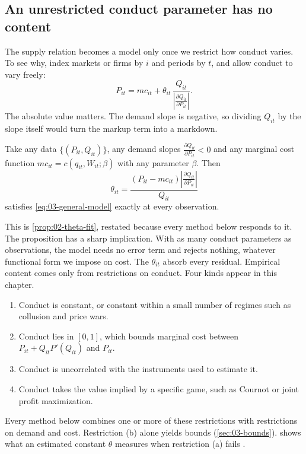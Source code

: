 \subsection{An unrestricted conduct parameter has no content}\label{sec:03-content}

The supply relation becomes a model only once we restrict how conduct varies. To see why, index markets or firms by
$i$ and periods by $t$, and allow conduct to vary freely:
\begin{equation}\label{eq:03-general-model}
P_{it} = mc_{it} + \theta_{it}\,\frac{Q_{it}}{\left\lvert \frac{\partial Q_{it}}{\partial P_{it}}\right\rvert}.
\end{equation}
The absolute value matters. The demand slope is negative, so dividing $Q_{it}$ by the slope itself would turn the
markup term into a markdown.

\begin{proposition}\label{prop:03-exact-fit}
Take any data $\{(P_{it}, Q_{it})\}$, any demand slopes $\frac{\partial Q_{it}}{\partial P_{it}} < 0$ and any marginal
cost function $mc_{it} = c(q_{it}, W_{it}; \beta)$ with any parameter $\beta$. Then
\begin{equation*}
\theta_{it} = \frac{(P_{it} - mc_{it})\left\lvert \frac{\partial Q_{it}}{\partial P_{it}}\right\rvert}{Q_{it}}
\end{equation*}
satisfies \eqref{eq:03-general-model} exactly at every observation.
\end{proposition}

This is \cref{prop:02-theta-fit}, restated because every method below responds to it. The proposition has a
sharp implication. With as many conduct parameters as observations, the model needs no error
term and rejects nothing, whatever functional form we impose on cost. The $\theta_{it}$ absorb every residual. Empirical
content comes only from restrictions on conduct. Four kinds appear in this chapter.
\begin{enumerate}[label=(\alph*)]
\item Conduct is constant, or constant within a small number of regimes such as collusion and price wars.
\item Conduct lies in $[0, 1]$, which bounds marginal cost between $P_{it} + Q_{it}P'(Q_{it})$ and $P_{it}$.
\item Conduct is uncorrelated with the instruments used to estimate it.
\item Conduct takes the value implied by a specific game, such as Cournot or joint profit maximization.
\end{enumerate}
Every method below combines one or more of these restrictions with restrictions on demand and cost. Restriction (b)
alone yields bounds (\cref{sec:03-bounds}).  shows what an estimated constant $\theta$ measures
when restriction (a) fails \citep{Corts1999}.


